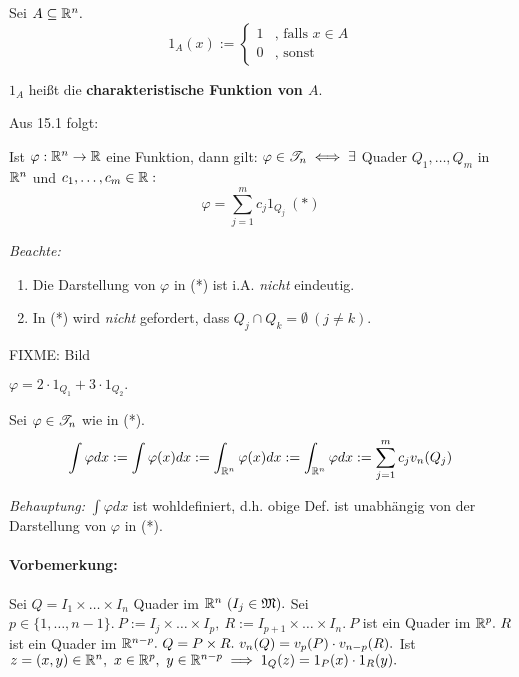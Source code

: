 \documentclass[a4paper,twoside,DIV15,BCOR12mm]{scrbook}
\begin{document}
\begin{definition}
Sei $A\subseteq\mathbb{R}^n.$
$$1_A(x):=\begin{cases}
1 & \text{, falls }x\in A\\
0 & \text{, sonst}
\end{cases}$$

$1_A$ heißt die \textbf{charakteristische Funktion von $A$}.
\end{definition}

Aus 15.1 folgt:

Ist $\varphi:\mathbb{R}^n\to\mathbb{R}$ eine Funktion, dann gilt: $\varphi\in\mathscr{T}_n \iff \exists$ Quader $Q_1,\ldots,Q_m$ in $\mathbb{R}^n$ und $c_1,\ldots,c_m\in\mathbb{R}:$
$$\varphi=\sum_{j=1}^m c_j1_{Q_j}\ (*)$$

\emph{Beachte:} \begin{enumerate}
\item Die Darstellung von $\varphi$ in (*) ist i.A. \emph{nicht} eindeutig.
\item In (*) wird \emph{nicht} gefordert, dass $Q_j\cap Q_k=\emptyset\ (j\ne k).$
\end{enumerate}

\begin{beispiel}
FIXME: Bild

$\varphi = 2\cdot1_{Q_1} + 3\cdot1_{Q_2}.$
\end{beispiel}

\begin{satz}
Sei $\varphi\in\mathscr{T}_n$ wie in (*). $$\int \varphi dx:=\int\varphi(x)dx:=\int_{\mathbb{R}^n}\varphi(x)dx:=\int_{\mathbb{R}^n}\varphi dx:=\sum_{j=1}^mc_jv_n(Q_j)$$

\emph{Behauptung:} $\int\varphi dx$ ist wohldefiniert, d.h. obige Def. ist unabhängig von der Darstellung von $\varphi$ in (*).
\end{satz}

\paragraph{Vorbemerkung:} Sei $Q=I_1\times\ldots\times I_n$ Quader im $\mathbb{R}^n\ (I_j\in\mathfrak{M}).$ Sei $p\in\{1,\ldots,n-1\}.\ P:=I_j\times\ldots\times I_p,\ R:=I_{p+1}\times\ldots\times I_n.\ P$ ist ein Quader im $\mathbb{R}^p.\ R$ ist ein Quader im $\MdR^{n-p}.\ Q=P\times R.\ v_n(Q)=v_p(P)\cdot v_{n-p}(R).$ Ist $z=(x,y)\in\mathbb{R}^n,\ x\in\mathbb{R}^p,\ y\in\mathbb{R}^{n-p} \implies 1_Q(z) = 1_P(x)\cdot1_R(y).$
\end{document}
